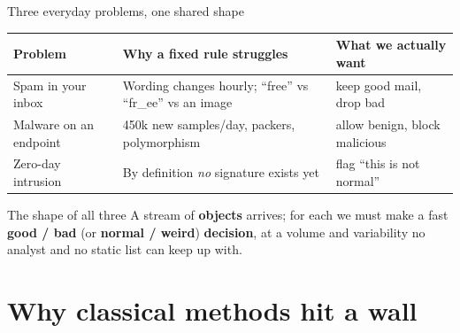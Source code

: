 \documentclass[aspectratio=169,10pt]{beamer}
\newcommand{\term}[1]{{\color{mlink}\textbf{#1}}}         %
\begin{document}
\begin{frame}{Three everyday problems, one shared shape}
  \small
  \renewcommand{\arraystretch}{1.35}
  \begin{tabular}{>{\raggedright\arraybackslash}p{2.7cm} >{\raggedright\arraybackslash}p{5.6cm} >{\raggedright\arraybackslash}p{3.4cm}}
    \toprule
    \textbf{Problem} & \textbf{Why a fixed rule struggles} & \textbf{What we actually want}\\
    \midrule
    Spam in your inbox & Wording changes hourly; ``free'' vs ``fr\_ee'' vs an image & keep good mail, drop bad\\
    Malware on an endpoint & 450k new samples/day, packers, polymorphism & allow benign, block malicious\\
    Zero-day intrusion & By definition \emph{no} signature exists yet & flag ``this is not normal''\\
    \bottomrule
  \end{tabular}
  \vfill
  \begin{block}{\small The shape of all three}
    \small A stream of \term{objects} arrives; for each we must make a fast
    \term{good / bad} (or \term{normal / weird}) \term{decision}, at a volume and
    variability no analyst and no static list can keep up with.
  \end{block}
\end{frame}

\section{Why classical methods hit a wall}
\end{document}
